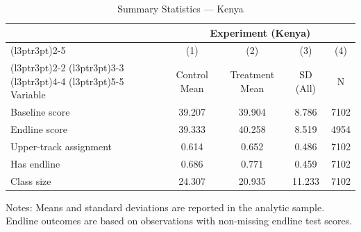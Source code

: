 \begin{table}[H]
\centering
\caption{Summary Statistics --- Kenya}
\label{tab:ke_sumstats}
\begin{threeparttable}
\begin{tabular}[t]{lcccc}
\toprule
\multicolumn{1}{c}{ } & \multicolumn{4}{c}{Experiment (Kenya)} \\
\cmidrule(l{3pt}r{3pt}){2-5}
\multicolumn{1}{c}{ } & \multicolumn{1}{c}{(1)} & \multicolumn{1}{c}{(2)} & \multicolumn{1}{c}{(3)} & \multicolumn{1}{c}{(4)} \\
\cmidrule(l{3pt}r{3pt}){2-2} \cmidrule(l{3pt}r{3pt}){3-3} \cmidrule(l{3pt}r{3pt}){4-4} \cmidrule(l{3pt}r{3pt}){5-5}
Variable & Control Mean & Treatment Mean & SD (All) & N \\
\midrule
Baseline score &  39.207 &  39.904 &   8.786 & 7102 \\
Endline score &  39.333 &  40.258 &   8.519 & 4954 \\
Upper-track assignment &   0.614 &   0.652 &   0.486 & 7102 \\
Has endline &   0.686 &   0.771 &   0.459 & 7102 \\
Class size &  24.307 &  20.935 &  11.233 & 7102 \\
\bottomrule
\end{tabular}
\begin{tablenotes}[para]
\item Notes: Means and standard deviations are reported in the analytic sample. Endline outcomes are based on observations with non-missing endline test scores.
\end{tablenotes}
\end{threeparttable}
\end{table}
